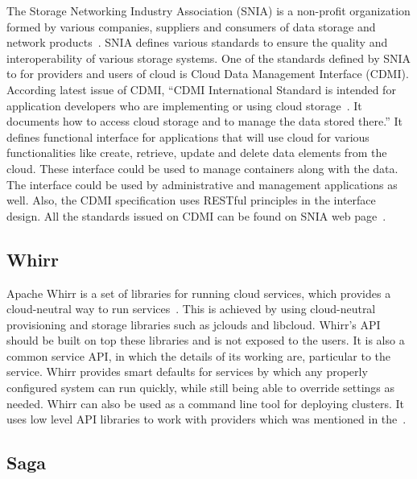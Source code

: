 The Storage Networking Industry Association (SNIA) is a non-profit
organization formed by various companies, suppliers and consumers of
data storage and network products~\cite{www-sniawebsite}. SNIA defines
various standards to ensure the quality and interoperability of
various storage systems. One of the standards defined by SNIA to for
providers and users of cloud is Cloud Data Management Interface
(CDMI). According latest issue of CDMI, ``CDMI International Standard
is intended for application developers who are implementing or using
cloud storage~\cite{cdmi-manual}. It documents how to access cloud
storage and to manage the data stored there.'' It defines functional
interface for applications that will use cloud for various
functionalities like create, retrieve, update and delete data elements
from the cloud. These interface could be used to manage containers
along with the data. The interface could be used by administrative and
management applications as well. Also, the CDMI specification uses
RESTful principles in the interface design. All the standards issued
on CDMI can be found on SNIA web page~\cite{www-cdmiwebsite}.


     \pv

\subsection{Whirr}
     
Apache Whirr is a set of libraries for running cloud services, which
provides a cloud-neutral way to run
services~\cite{www-ApacheWhirr}. This is achieved by using
cloud-neutral provisioning and storage libraries such as jclouds and
libcloud. Whirr's API should be built on top these libraries and is
not exposed to the users. It is also a common service API, in which
the details of its working are, particular to the service.  Whirr
provides smart defaults for services by which any properly configured
system can run quickly, while still being able to override settings as
needed. Whirr can also be used as a command line tool for deploying
clusters. It uses low level API libraries to work with providers which
was mentioned in the~\cite{www-slideshare-ApacheWhirr}.

     
\subsection{Saga}


